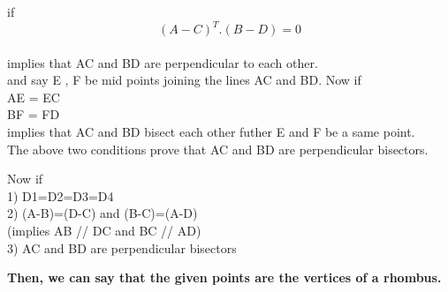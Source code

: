 \documentclass{article}
\begin{document}
\vspace{20cm}



if $$( A-C )^T . ( B-D ) = 0 $$\\
implies that AC and BD are perpendicular to each other.\\ 

and say E , F be mid points joining the lines AC and BD. Now if\\
AE = EC \\
BF = FD \\ 
implies that AC and BD bisect each other futher E and F be a same point.\\

The above two conditions prove that AC and BD are perpendicular bisectors.
\vspace{5mm} %

Now if \\ 1) D1=D2=D3=D4\\ 
2) (A-B)=\pm(D-C) and (B-C)=\pm(A-D)\\
  (implies AB // DC and BC // AD)\\
3) AC and BD are perpendicular bisectors

\vspace{5mm} %
\textbf{Then, we can say that the given points are the vertices of a rhombus.}
\end{document}
